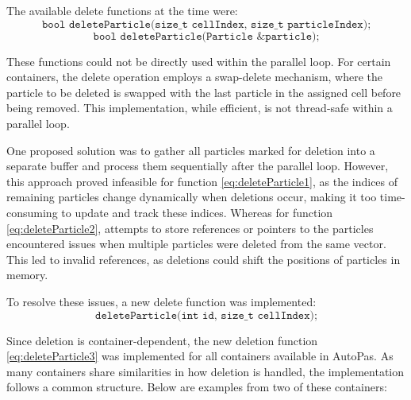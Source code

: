 The available delete functions at the time were:
\begin{equation}
  \texttt{bool deleteParticle(size\_t cellIndex, size\_t particleIndex);}
  \label{eq:deleteParticle1}
\end{equation}
\begin{equation}
  \texttt{bool deleteParticle(Particle \&particle);}
  \label{eq:deleteParticle2}
\end{equation}

These functions could not be directly used within the parallel loop. For certain containers, the delete operation employs a swap-delete mechanism, where the particle to be deleted is swapped with the last particle in the assigned cell before being removed. This implementation, while efficient, is not thread-safe within a parallel loop.

One proposed solution was to gather all particles marked for deletion into a separate buffer and process them sequentially after the parallel loop. However, this approach proved infeasible for function \ref{eq:deleteParticle1}, as the indices of remaining particles change dynamically when deletions occur, making it too time-consuming to update and track these indices. Whereas for function \ref{eq:deleteParticle2}, attempts to store references or pointers to the particles encountered issues when multiple particles were deleted from the same vector. This led to invalid references, as deletions could shift the positions of particles in memory.

To resolve these issues, a new delete function was implemented:
\begin{equation}
  \texttt{deleteParticle(int id, size\_t cellIndex);}
  \label{eq:deleteParticle3}
\end{equation}

Since deletion is container-dependent, the new deletion function \ref{eq:deleteParticle3} was implemented for all containers available in AutoPas. As many containers share similarities in how deletion is handled, the implementation follows a common structure. Below are examples from two of these containers:  


